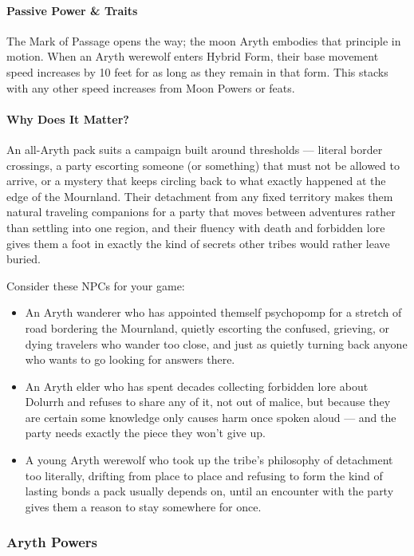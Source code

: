 \documentclass[twocolumn]{dndbook}
\begin{document}
\paragraph*{Passive Power \& Traits} The Mark of Passage opens the way; the moon Aryth embodies that principle in motion.
When an Aryth werewolf enters Hybrid Form, their base movement speed increases by 10 feet for as long as they remain in that form.
This stacks with any other speed increases from Moon Powers or feats.\par

\paragraph*{Why Does It Matter?} An all-Aryth pack suits a campaign built around thresholds --- literal border crossings, a party escorting someone (or something) that must not be allowed to arrive, or a mystery that keeps circling back to what exactly happened at the edge of the Mournland.
Their detachment from any fixed territory makes them natural traveling companions for a party that moves between adventures rather than settling into one region, and their fluency with death and forbidden lore gives them a foot in exactly the kind of secrets other tribes would rather leave buried.

Consider these NPCs for your game:
\begin{itemize}
    \item An Aryth wanderer who has appointed themself psychopomp for a stretch of road bordering the Mournland, quietly escorting the confused, grieving, or dying travelers who wander too close, and just as quietly turning back anyone who wants to go looking for answers there.
    \item An Aryth elder who has spent decades collecting forbidden lore about Dolurrh and refuses to share any of it, not out of malice, but because they are certain some knowledge only causes harm once spoken aloud --- and the party needs exactly the piece they won't give up.
    \item A young Aryth werewolf who took up the tribe's philosophy of detachment too literally, drifting from place to place and refusing to form the kind of lasting bonds a pack usually depends on, until an encounter with the party gives them a reason to stay somewhere for once.
\end{itemize}


\subsubsection{Aryth Powers}
\end{document}
